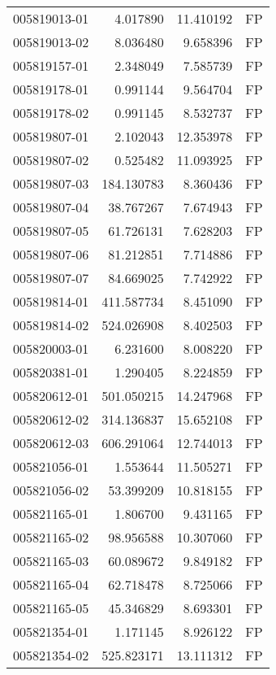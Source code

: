 \begin{tabular}{lrrl}
005819013-01 &    4.017890 &      11.410192 &   FP \\
005819013-02 &    8.036480 &       9.658396 &   FP \\
005819157-01 &    2.348049 &       7.585739 &   FP \\
005819178-01 &    0.991144 &       9.564704 &   FP \\
005819178-02 &    0.991145 &       8.532737 &   FP \\
005819807-01 &    2.102043 &      12.353978 &   FP \\
005819807-02 &    0.525482 &      11.093925 &   FP \\
005819807-03 &  184.130783 &       8.360436 &   FP \\
005819807-04 &   38.767267 &       7.674943 &   FP \\
005819807-05 &   61.726131 &       7.628203 &   FP \\
005819807-06 &   81.212851 &       7.714886 &   FP \\
005819807-07 &   84.669025 &       7.742922 &   FP \\
005819814-01 &  411.587734 &       8.451090 &   FP \\
005819814-02 &  524.026908 &       8.402503 &   FP \\
005820003-01 &    6.231600 &       8.008220 &   FP \\
005820381-01 &    1.290405 &       8.224859 &   FP \\
005820612-01 &  501.050215 &      14.247968 &   FP \\
005820612-02 &  314.136837 &      15.652108 &   FP \\
005820612-03 &  606.291064 &      12.744013 &   FP \\
005821056-01 &    1.553644 &      11.505271 &   FP \\
005821056-02 &   53.399209 &      10.818155 &   FP \\
005821165-01 &    1.806700 &       9.431165 &   FP \\
005821165-02 &   98.956588 &      10.307060 &   FP \\
005821165-03 &   60.089672 &       9.849182 &   FP \\
005821165-04 &   62.718478 &       8.725066 &   FP \\
005821165-05 &   45.346829 &       8.693301 &   FP \\
005821354-01 &    1.171145 &       8.926122 &   FP \\
005821354-02 &  525.823171 &      13.111312 &   FP \\

\end{tabular}
